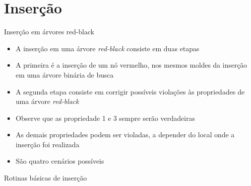 \section{Inserção}

\begin{frame}[fragile]{Inserção em árvores red-black}

    \begin{itemize}
        \item A inserção em uma árvore \textit{red-black} consiste em duas etapas

        \item A primeira é a inserção de um nó vermelho, nos mesmos moldes da inserção em
            uma árvore binária de busca

        \item A segunda etapa consiste em corrigir possíveis violações às propriedades de 
            uma árvore \textit{red-black}

        \item Observe que as propriedade 1 e 3 sempre serão verdadeiras

        \item As demais propriedades podem ser violadas, a depender do local onde a 
            inserção foi realizada

        \item São quatro cenários possíveis
    \end{itemize}

\end{frame}

\begin{frame}[fragile]{Rotinas básicas de inserção}
\end{frame}

